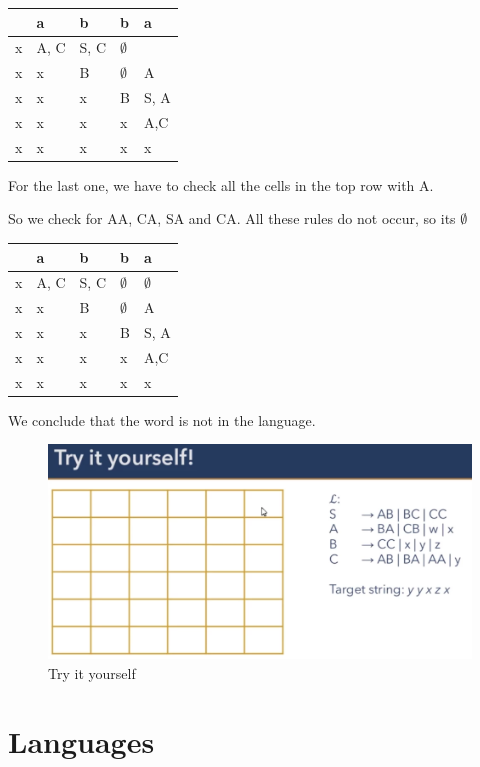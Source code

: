 \documentclass[
  11pt,
  british,
]{article}
\begin{document}
\begin{longtable}[]{@{}lllll@{}}
\toprule
& a & b & b & a \\
\midrule
\endhead
x & A, C & S, C & \(\emptyset\) & \\
x & x & B & \(\emptyset\) & A \\
x & x & x & B & S, A \\
x & x & x & x & A,C \\
x & x & x & x & x \\
\bottomrule
\end{longtable}

For the last one, we have to check all the cells in the top row with A.

So we check for AA, CA, SA and CA. All these rules do not occur, so its
\(\emptyset\)

\begin{longtable}[]{@{}lllll@{}}
\toprule
& a & b & b & a \\
\midrule
\endhead
x & A, C & S, C & \(\emptyset\) & \(\emptyset\) \\
x & x & B & \(\emptyset\) & A \\
x & x & x & B & S, A \\
x & x & x & x & A,C \\
x & x & x & x & x \\
\bottomrule
\end{longtable}

We conclude that the word is not in the language.

\begin{figure}
\centering
\includegraphics{Pasted_image_20220314195726.png}
\caption{Try it yourself}
\end{figure}

\hypertarget{languages}{%
\section{Languages}\label{languages}}
\end{document}
